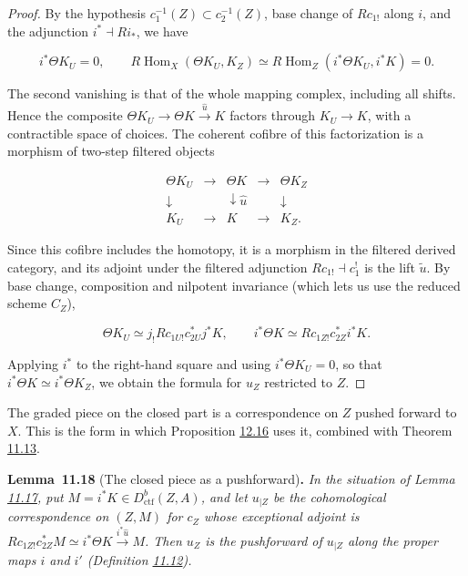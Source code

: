 \documentclass[11pt]{article}
\newenvironment{bpstatement}[2]{\par\addvspace{0.6\baselineskip}\noindent\textbf{#1}#2\textbf{.}\enspace\ignorespaces}
  {\par\addvspace{0.4\baselineskip}}
\newenvironment{bpstatementit}[2]{\begin{bpstatement}{#1}{#2}\itshape\ignorespaces}{\end{bpstatement}}
\begin{document}
\begin{proof}[{Proof}]\label{bp218}%
By the hypothesis \(c_1^{-1}(Z)\subset c_2^{-1}(Z)\), base change of \(Rc_{1!}\) along \(i\), and the adjunction \(i^*\dashv Ri_*\), we have

\[
i^*\Theta K_U=0,\qquad
R\operatorname{Hom}_X(\Theta K_U,K_Z)
\simeq R\operatorname{Hom}_Z(i^*\Theta K_U,i^*K)=0.
\]

The second vanishing is that of the whole mapping complex, including all shifts. Hence the composite \(\Theta K_U\to\Theta K\xrightarrow{\widehat u}K\) factors through \(K_U\to K\), with a contractible space of choices. The coherent cofibre of this factorization is a morphism of two-step filtered objects

\[
\begin{array}{ccccc}
\Theta K_U&\longrightarrow&\Theta K&\longrightarrow&\Theta K_Z\\
\downarrow&&\downarrow \widehat u&&\downarrow\\
K_U&\longrightarrow&K&\longrightarrow&K_Z.
\end{array}
\]

Since this cofibre includes the homotopy, it is a morphism in the filtered derived category, and its adjoint under the filtered adjunction \(Rc_{1!}\dashv c_1^!\) is the lift \(\tilde u\). By base change, composition and nilpotent invariance (which lets us use the reduced scheme \(C_Z\)),

\[
\Theta K_U\simeq j_!Rc_{1U!}c_{2U}^*j^*K,
\qquad i^*\Theta K\simeq Rc_{1Z!}c_{2Z}^*i^*K.
\]

Applying \(i^*\) to the right-hand square and using \(i^*\Theta K_U=0\), so that \(i^*\Theta K\simeq i^*\Theta K_Z\), we obtain the formula for \(\widehat u_Z\) restricted to \(Z\).
\end{proof}

\label{bp219}%
The graded piece on the closed part is a correspondence on \(Z\) pushed forward to \(X\). This is the form in which Proposition \hyperref[bp274]{12.16} uses it, combined with Theorem \hyperref[bp206]{11.13}.

\label{bp220}%
\begin{bpstatementit}{Lemma~11.18}{ (The closed piece as a pushforward)}
In the situation of Lemma \hyperref[bp217]{11.17}, put \(M=i^*K\in D^b_{\mathrm{ctf}}(Z,A)\), and let \(u_{|Z}\) be the cohomological correspondence on \((Z,M)\) for \(c_Z\) whose exceptional adjoint is \(Rc_{1Z!}c_{2Z}^*M\simeq i^*\Theta K\xrightarrow{i^*\widehat u}M\). Then \(u_Z\) is the pushforward of \(u_{|Z}\) along the proper maps \(i\) and \(i'\) (Definition \hyperref[bp204]{11.12}).
\end{bpstatementit}
\end{document}

